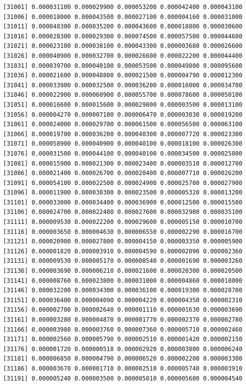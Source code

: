 \documentclass[]{article}
\begin{document}
\begin{verbatim}
[31001] 0.000031100 0.000029900 0.000053200 0.000042400 0.000043100
[31006] 0.000018000 0.000043500 0.000027100 0.000004160 0.000031000
[31011] 0.000048300 0.000035200 0.000043600 0.000018800 0.000030600
[31016] 0.000028300 0.000029300 0.000074500 0.000057500 0.000044600
[31021] 0.000023100 0.000038100 0.000043300 0.000003680 0.000026600
[31026] 0.000040900 0.000032700 0.000026600 0.000022200 0.000044400
[31031] 0.000039700 0.000040100 0.000053500 0.000049800 0.000095600
[31036] 0.000021600 0.000048800 0.000021500 0.000004790 0.000012300
[31041] 0.000033900 0.000032500 0.000036200 0.000016000 0.000034700
[31046] 0.000022900 0.000060900 0.000055700 0.000078600 0.000050100
[31051] 0.000016600 0.000015600 0.000029800 0.000003500 0.000013100
[31056] 0.000004270 0.000007100 0.000006470 0.000003030 0.000019200
[31061] 0.000024000 0.000029700 0.000061500 0.000056500 0.000063100
[31066] 0.000019700 0.000036200 0.000040300 0.000007720 0.000023300
[31071] 0.000058900 0.000040900 0.000040100 0.000018100 0.000026300
[31076] 0.000031500 0.000044100 0.000040100 0.000034500 0.000025800
[31081] 0.000015900 0.000021300 0.000023400 0.000003510 0.000012700
[31086] 0.000021400 0.000026700 0.000020400 0.000007710 0.000026200
[31091] 0.000054100 0.000022500 0.000024900 0.000025700 0.000027900
[31096] 0.000011900 0.000030300 0.000023500 0.000005320 0.000013200
[31101] 0.000033000 0.000034400 0.000036900 0.000012500 0.000015500
[31106] 0.000024700 0.000022400 0.000027600 0.000032900 0.000035100
[31111] 0.000009530 0.000022200 0.000029600 0.000005150 0.000010700
[31116] 0.000003650 0.000004630 0.000006550 0.000002290 0.000016700
[31121] 0.000020900 0.000027800 0.000004150 0.000003350 0.000005900
[31126] 0.000001820 0.000003910 0.000004590 0.000002090 0.000002360
[31131] 0.000009530 0.000005170 0.000008540 0.000001690 0.000003260
[31136] 0.000003690 0.000006210 0.000021600 0.000020300 0.000020500
[31141] 0.000008760 0.000023800 0.000031000 0.000004860 0.000018000
[31146] 0.000032200 0.000034300 0.000036100 0.000019300 0.000028700
[31151] 0.000036400 0.000004090 0.000004220 0.000004350 0.000002310
[31156] 0.000002700 0.000002640 0.000001110 0.000001630 0.000003690
[31161] 0.000003280 0.000004870 0.000001770 0.000002370 0.000002780
[31166] 0.000003980 0.000003760 0.000007360 0.000005710 0.000002460
[31171] 0.000002560 0.000005790 0.000002510 0.000001420 0.000002150
[31176] 0.000001720 0.000000518 0.000002920 0.000003800 0.000006240
[31181] 0.000006850 0.000004790 0.000006520 0.000002200 0.000003300
[31186] 0.000003670 0.000001710 0.000002510 0.000005740 0.000003910
[31191] 0.000005240 0.000003500 0.000005010 0.000005600 0.000004540

\end{verbatim}
\end{document}
